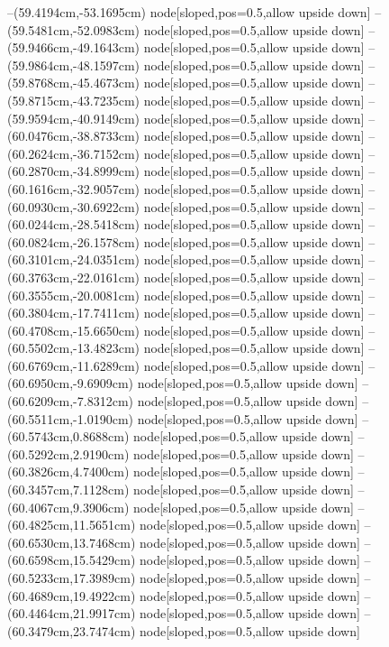 --(59.4194cm,-53.1695cm) node[sloped,pos=0.5,allow upside down]{\ArrowIn}
--(59.5481cm,-52.0983cm) node[sloped,pos=0.5,allow upside down]{\ArrowIn}
--(59.9466cm,-49.1643cm) node[sloped,pos=0.5,allow upside down]{\ArrowIn}
--(59.9864cm,-48.1597cm) node[sloped,pos=0.5,allow upside down]{\ArrowIn}
--(59.8768cm,-45.4673cm) node[sloped,pos=0.5,allow upside down]{\ArrowIn}
--(59.8715cm,-43.7235cm) node[sloped,pos=0.5,allow upside down]{\ArrowIn}
--(59.9594cm,-40.9149cm) node[sloped,pos=0.5,allow upside down]{\ArrowIn}
--(60.0476cm,-38.8733cm) node[sloped,pos=0.5,allow upside down]{\ArrowIn}
--(60.2624cm,-36.7152cm) node[sloped,pos=0.5,allow upside down]{\ArrowIn}
--(60.2870cm,-34.8999cm) node[sloped,pos=0.5,allow upside down]{\ArrowIn}
--(60.1616cm,-32.9057cm) node[sloped,pos=0.5,allow upside down]{\ArrowIn}
--(60.0930cm,-30.6922cm) node[sloped,pos=0.5,allow upside down]{\ArrowIn}
--(60.0244cm,-28.5418cm) node[sloped,pos=0.5,allow upside down]{\ArrowIn}
--(60.0824cm,-26.1578cm) node[sloped,pos=0.5,allow upside down]{\ArrowIn}
--(60.3101cm,-24.0351cm) node[sloped,pos=0.5,allow upside down]{\ArrowIn}
--(60.3763cm,-22.0161cm) node[sloped,pos=0.5,allow upside down]{\ArrowIn}
--(60.3555cm,-20.0081cm) node[sloped,pos=0.5,allow upside down]{\ArrowIn}
--(60.3804cm,-17.7411cm) node[sloped,pos=0.5,allow upside down]{\ArrowIn}
--(60.4708cm,-15.6650cm) node[sloped,pos=0.5,allow upside down]{\ArrowIn}
--(60.5502cm,-13.4823cm) node[sloped,pos=0.5,allow upside down]{\ArrowIn}
--(60.6769cm,-11.6289cm) node[sloped,pos=0.5,allow upside down]{\ArrowIn}
--(60.6950cm,-9.6909cm) node[sloped,pos=0.5,allow upside down]{\ArrowIn}
--(60.6209cm,-7.8312cm) node[sloped,pos=0.5,allow upside down]{\ArrowIn}
--(60.5511cm,-1.0190cm) node[sloped,pos=0.5,allow upside down]{\ArrowIn}
--(60.5743cm,0.8688cm) node[sloped,pos=0.5,allow upside down]{\ArrowIn}
--(60.5292cm,2.9190cm) node[sloped,pos=0.5,allow upside down]{\ArrowIn}
--(60.3826cm,4.7400cm) node[sloped,pos=0.5,allow upside down]{\ArrowIn}
--(60.3457cm,7.1128cm) node[sloped,pos=0.5,allow upside down]{\ArrowIn}
--(60.4067cm,9.3906cm) node[sloped,pos=0.5,allow upside down]{\ArrowIn}
--(60.4825cm,11.5651cm) node[sloped,pos=0.5,allow upside down]{\ArrowIn}
--(60.6530cm,13.7468cm) node[sloped,pos=0.5,allow upside down]{\ArrowIn}
--(60.6598cm,15.5429cm) node[sloped,pos=0.5,allow upside down]{\ArrowIn}
--(60.5233cm,17.3989cm) node[sloped,pos=0.5,allow upside down]{\ArrowIn}
--(60.4689cm,19.4922cm) node[sloped,pos=0.5,allow upside down]{\ArrowIn}
--(60.4464cm,21.9917cm) node[sloped,pos=0.5,allow upside down]{\ArrowIn}
--(60.3479cm,23.7474cm) node[sloped,pos=0.5,allow upside down]{\ArrowIn}
